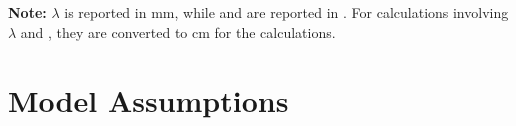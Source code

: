 \begin{table}[ht]
\begin{tabular}{lll}
\bottomrule
\end{tabular}
\begin{tablenotes}
\footnotesize
\item \textbf{Note:} $\lambda$ is reported in mm, while \achar and \amax are reported in \micronNS. For calculations involving $\lambda$ and \amaxNS, they are converted to cm for the calculations. 
\end{tablenotes}
\end{table}






\section{Model Assumptions}
\label{sec: model_assumptions}














